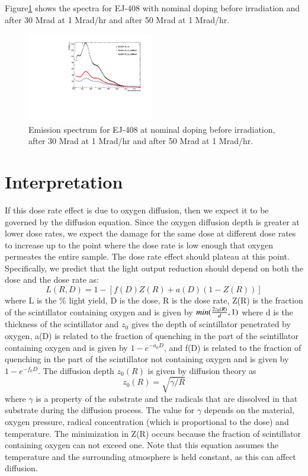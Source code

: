 \documentclass[review]{elsarticle}
\begin{document}
Figure\ref{fig:ej408doping1x} shows the spectra for EJ-408 with nominal doping before irradiation and after
30 Mrad at 1 Mrad/hr and after 50 Mrad at 1 Mrad/hr.

\begin{figure}[!ht]
\begin{center}
\includegraphics[width=0.49\textwidth]{plot_EJ200-1X_EMS.pdf}
\caption{
Emission spectrum for EJ-408 at nominal doping before irradiation, after 30 Mrad at 1 Mrad/hr and after 50 Mrad at 1 Mrad/hr.
}
\label{fig:ej408doping1x}
\end{center}
\end{figure}


\section{Interpretation}


If this dose rate effect is due to oxygen diffusion, then
we expect it to be governed by the diffusion equation.  Since
the oxygen diffusion depth is greater at lower dose rates,
we expect the damage for the same dose at different dose rates to
increase up to the point where the dose rate is low enough that oxygen
permeates the entire sample.  The dose rate effect should plateau
at this point.  Specifically, we predict that the light output
reduction should depend on both the dose and the dose rate as:
$$ L(R,D) = 1 - [f(D)Z(R) + a(D)(1-Z(R))]$$
where L is the \% light yield, D is the dose, R is the dose rate, 
Z(R) is the fraction of the scintillator containing 
oxygen and is given by $min({{2 z_0(R)}\over{d}},1)$
where d is the thickness of the scintillator and $z_0$ gives
the depth of scintillator penetrated by oxygen,
a(D) is related to the fraction of quenching in the part of
the scintillator containing oxygen and is given by $1-e^{-a_0 D}$, 
and
f(D) is related to the fraction of quenching in the part of
the scintillator not containing oxygen and is given by $1-e^{-f_0 D}$.
The diffusion depth $z_0(R)$ is given by diffusion theory as 
$$z_0(R)=\sqrt{\gamma/R}$$
where $\gamma$ is a property of the substrate and the radicals that
are dissolved in that substrate during the diffusion process.
The value for $\gamma$ depends on the material, oxygen pressure,
radical concentration (which is proportional to the dose) and 
temperature.
The minimization in Z(R) occurs because the fraction of scintillator
containing oxygen can not exceed one.  Note that this equation 
assumes the temperature and the surrounding atmosphere
is held constant, as this can 
affect diffusion.
\end{document}
